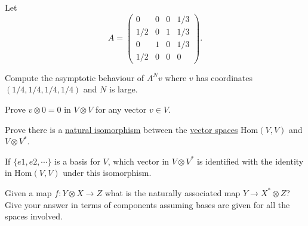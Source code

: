   \begin{exercise} 
    Let
    \begin{equation}
      A = \begin{pmatrix}
            0 & 0 & 0 & 1/3 \\
            1/2 & 0 & 1 & 1/3 \\
            0 & 1 & 0 & 1/3 \\
            1/2 & 0 & 0 & 0
          \end{pmatrix}.
    \end{equation}
    
    Compute the asymptotic behaviour of $A^N v$ where $v$ has coordinates $(1/4, 1/4, 1/4, 1/4)$ and $N$ is large.
  \end{exercise}

  \begin{exercise} 
    Prove $v \otimes 0 = 0$ in $V \otimes V$ for any vector $v \in V$.
  \end{exercise}

  \begin{exercise} 
    Prove there is a \hyperref[cat-def:natural-isomorphism]{natural isomorphism} between the \hyperref[def:vector-space]{vector spaces} $\text{Hom}(V,V)$ and $V \otimes V^*$.
  \end{exercise}

  \begin{exercise} 
    If $\{e1, e2, \cdots\}$ is a basis for $V$, which vector in $V \otimes V^*$ is identified with the identity in $\text{Hom}(V,V)$ under this isomorphism.
  \end{exercise}

  \begin{exercise} 
    Given a map $f : Y \otimes X \to Z$ what is the naturally associated map $Y \to X^* \otimes Z$? Give your answer in terms of components assuming bases are given for all the spaces involved.
  \end{exercise}

